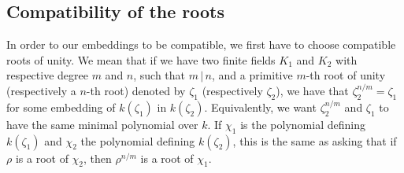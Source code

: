 \documentclass[a4paper,11pt]{article}
\begin{document}
\subsection{Compatibility of the roots}
In order to our embeddings to be compatible, we first have to choose compatible
roots of unity. We mean that if we have two finite fields $K_1$ and  $K_2$ with
respective degree $m$ and $n$, such that $m\,|\,n$, and a
primitive $m$-th root of unity (respectively a $n$-th root)
denoted by $\zeta_1$ (respectively $\zeta_2$), we have that
$\zeta_2^{n/m}=\zeta_1$ for some embedding of $k(\zeta_1)$ in $k(\zeta_2)$.
Equivalently, we want $\zeta_2^{n/m}$ and $\zeta_1$ to have the same minimal
polynomial over $k$. If $\chi_1$ is the polynomial defining $k(\zeta_1)$ and
$\chi_2$ the polynomial defining $k(\zeta_2)$, this is the same as asking that
if $\rho$ is a root of $\chi_2$, then $\rho^{n/m}$ is a root of $\chi_1$.
\end{document}

